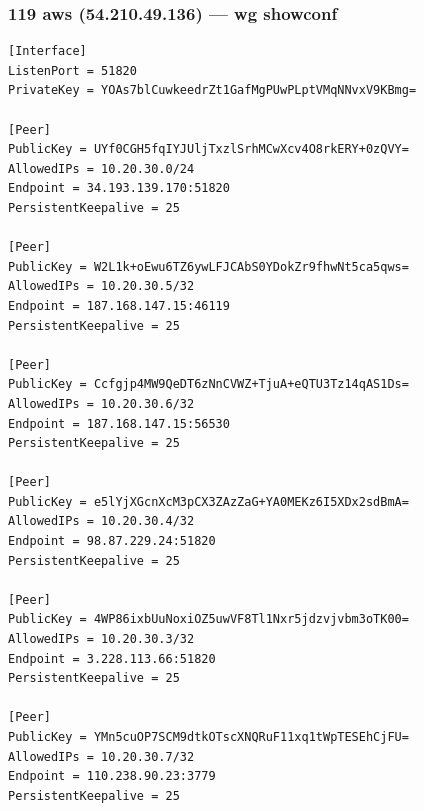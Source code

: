 \documentclass[11pt,a4paper]{article}
\begin{document}
\subsubsection*{119 aws (54.210.49.136) — wg showconf}
\begin{lstlisting}
[Interface]
ListenPort = 51820
PrivateKey = YOAs7blCuwkeedrZt1GafMgPUwPLptVMqNNvxV9KBmg=

[Peer]
PublicKey = UYf0CGH5fqIYJUljTxzlSrhMCwXcv4O8rkERY+0zQVY=
AllowedIPs = 10.20.30.0/24
Endpoint = 34.193.139.170:51820
PersistentKeepalive = 25

[Peer]
PublicKey = W2L1k+oEwu6TZ6ywLFJCAbS0YDokZr9fhwNt5ca5qws=
AllowedIPs = 10.20.30.5/32
Endpoint = 187.168.147.15:46119
PersistentKeepalive = 25

[Peer]
PublicKey = Ccfgjp4MW9QeDT6zNnCVWZ+TjuA+eQTU3Tz14qAS1Ds=
AllowedIPs = 10.20.30.6/32
Endpoint = 187.168.147.15:56530
PersistentKeepalive = 25

[Peer]
PublicKey = e5lYjXGcnXcM3pCX3ZAzZaG+YA0MEKz6I5XDx2sdBmA=
AllowedIPs = 10.20.30.4/32
Endpoint = 98.87.229.24:51820
PersistentKeepalive = 25

[Peer]
PublicKey = 4WP86ixbUuNoxiOZ5uwVF8Tl1Nxr5jdzvjvbm3oTK00=
AllowedIPs = 10.20.30.3/32
Endpoint = 3.228.113.66:51820
PersistentKeepalive = 25

[Peer]
PublicKey = YMn5cuOP7SCM9dtkOTscXNQRuF11xq1tWpTESEhCjFU=
AllowedIPs = 10.20.30.7/32
Endpoint = 110.238.90.23:3779
PersistentKeepalive = 25

\end{lstlisting}
\end{document}
